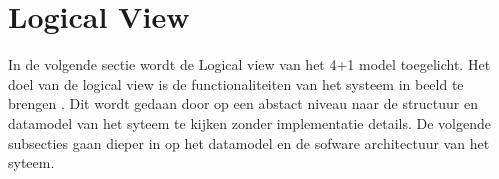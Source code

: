 \section{Logical View}
In de volgende sectie wordt de Logical view van het 4+1 model toegelicht.
Het doel van de logical view is de functionaliteiten van het systeem in beeld te brengen \parencite{4+1ViewModelPaper}.
Dit wordt gedaan door op een abstact niveau naar de structuur en datamodel van het syteem te kijken zonder implementatie details.
De volgende subsecties gaan dieper in op het datamodel en de sofware architectuur van het syteem.



